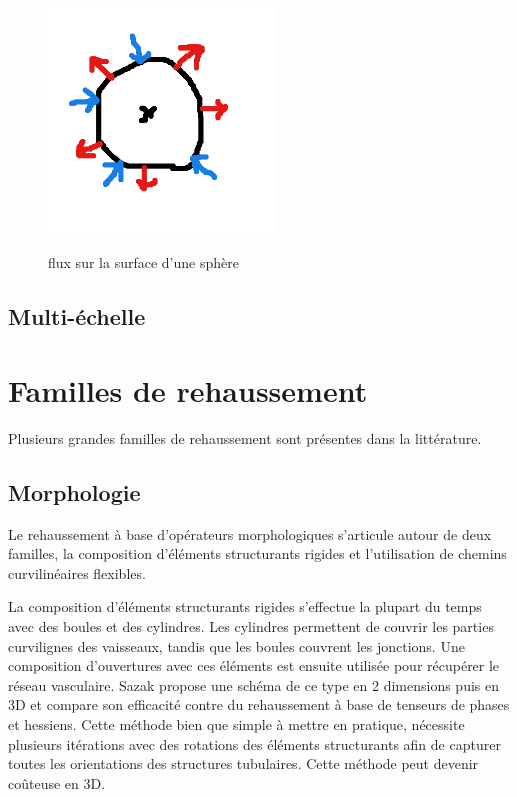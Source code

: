 \begin{figure}
  \centering
  \includegraphics[height=6cm]{Images/flux.png}
  \label{fig:flux_sphere}
  \caption{flux sur la surface d'une sphère}
\end{figure}

\subsection{Multi-échelle}
\label{sec:EA:rehaussement:echelle:multiScale}



\section{Familles de rehaussement}
\label{sec:EA:rehaussement:famille}

Plusieurs grandes familles de rehaussement sont présentes dans la littérature. 

\subsection{Morphologie}
\label{sec:EA:rehaussement:morpho}

Le rehaussement à base d'opérateurs morphologiques s'articule autour de deux familles, la composition d'éléments structurants rigides et l'utilisation de chemins curvilinéaires flexibles.

La composition d'éléments structurants rigides s'effectue la plupart du temps avec des boules et des cylindres. Les cylindres permettent de couvrir les parties curvilignes des vaisseaux, tandis que les boules couvrent les jonctions. Une composition d'ouvertures avec ces éléments est ensuite utilisée pour récupérer le réseau vasculaire. Sazak propose une schéma de ce type en 2 dimensions \cite{sazak_2D} puis en 3D \cite{sazak_3D} et compare son efficacité contre du rehaussement à base de tenseurs de phases et hessiens. Cette méthode bien que simple à mettre en pratique, nécessite plusieurs itérations avec des rotations des éléments structurants afin de capturer toutes les orientations des structures tubulaires. Cette méthode peut devenir coûteuse en 3D.

